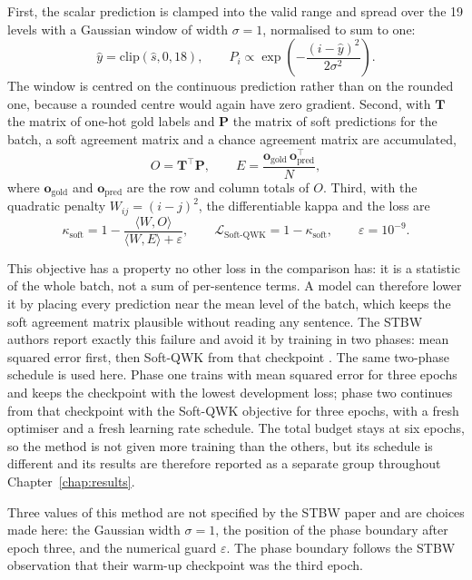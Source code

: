 First, the scalar prediction is clamped into the valid range and spread over the 19 levels with
a Gaussian window of width $\sigma=1$, normalised to sum to one:
\begin{equation}
\hat{y} = \mathrm{clip}(\hat{s},0,18), \qquad
P_i \propto \exp\left(-\frac{(i-\hat{y})^2}{2\sigma^2}\right) .
\end{equation}
The window is centred on the continuous prediction rather than on the rounded one, because a
rounded centre would again have zero gradient. Second, with $\mathbf{T}$ the matrix of one-hot
gold labels and $\mathbf{P}$ the matrix of soft predictions for the batch, a soft agreement
matrix and a chance agreement matrix are accumulated,
\begin{equation}
O = \mathbf{T}^{\top}\mathbf{P}, \qquad
E = \frac{\mathbf{o}_{\text{gold}}\,\mathbf{o}_{\text{pred}}^{\top}}{N},
\end{equation}
where $\mathbf{o}_{\text{gold}}$ and $\mathbf{o}_{\text{pred}}$ are the row and column totals
of $O$. Third, with the quadratic penalty $W_{ij}=(i-j)^2$, the differentiable kappa and the
loss are
\begin{equation}
\kappa_{\text{soft}} = 1 - \frac{\langle W,O\rangle}{\langle W,E\rangle + \varepsilon},
\qquad
\mathcal{L}_{\text{Soft-QWK}} = 1-\kappa_{\text{soft}},
\qquad \varepsilon = 10^{-9}.
\end{equation}

This objective has a property no other loss in the comparison has: it is a statistic of the
whole batch, not a sum of per-sentence terms. A model can therefore lower it by placing every
prediction near the mean level of the batch, which keeps the soft agreement matrix plausible
without reading any sentence. The STBW authors report exactly this failure and avoid it by
training in two phases: mean squared error first, then Soft-QWK from that checkpoint
\cite{trigui2025stbw}. The same two-phase schedule is used here. Phase one trains with mean
squared error for three epochs and keeps the checkpoint with the lowest development loss; phase
two continues from that checkpoint with the Soft-QWK objective for three epochs, with a fresh
optimiser and a fresh learning rate schedule. The total budget stays at six epochs, so the
method is not given more training than the others, but its schedule is different and its
results are therefore reported as a separate group throughout Chapter~\ref{chap:results}.

Three values of this method are not specified by the STBW paper and are choices made here: the
Gaussian width $\sigma=1$, the position of the phase boundary after epoch three, and the
numerical guard $\varepsilon$. The phase boundary follows the STBW observation that their
warm-up checkpoint was the third epoch.

